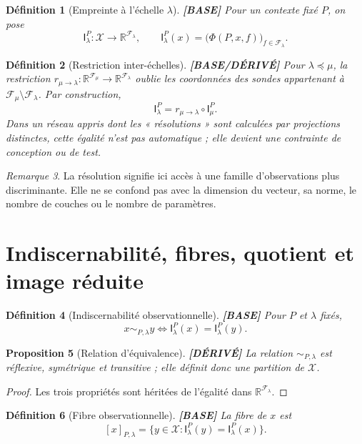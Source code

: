 \documentclass[11pt,a4paper]{article}
\newtheorem{definition}{Définition}[section]
\newtheorem{proposition}[definition]{Proposition}
\theoremstyle{remark}
\newtheorem{remark}[definition]{Remarque}
\newcommand{\R}{\mathbb R}
\newcommand{\X}{\mathcal X}
\newcommand{\F}{\mathcal F}
\newcommand{\Emp}{\mathsf I}
\begin{document}
\begin{definition}[Empreinte à l'échelle $\lambda$] \textbf{[BASE]}
Pour un contexte fixé $P$, on pose
\[
\Emp_{\lambda}^{P}:\X\to\R^{\F_\lambda},\qquad
\Emp_{\lambda}^{P}(x)=\big(\Phi(P,x,f)\big)_{f\in\F_\lambda}.
\]
\end{definition}

\begin{definition}[Restriction inter-échelles] \textbf{[BASE/DÉRIVÉ]}
Pour $\lambda\preceq\mu$, la restriction $r_{\mu\to\lambda}:\R^{\F_\mu}\to\R^{\F_\lambda}$ oublie les coordonnées des sondes appartenant à $\F_\mu\setminus\F_\lambda$. Par construction,
\[
\boxed{\Emp_\lambda^P=r_{\mu\to\lambda}\circ\Emp_\mu^P.}
\]
Dans un réseau appris dont les « résolutions » sont calculées par projections distinctes, cette égalité n'est pas automatique ; elle devient une contrainte de conception ou de test.
\end{definition}

\begin{remark}
La résolution signifie ici accès à une famille d'observations plus discriminante. Elle ne se confond pas avec la dimension du vecteur, sa norme, le nombre de couches ou le nombre de paramètres.
\end{remark}

\section{Indiscernabilité, fibres, quotient et image réduite}

\begin{definition}[Indiscernabilité observationnelle] \textbf{[BASE]}
Pour $P$ et $\lambda$ fixés,
\[
\boxed{x\sim_{P,\lambda}y\iff\Emp_\lambda^P(x)=\Emp_\lambda^P(y).}
\]
\end{definition}

\begin{proposition}[Relation d'équivalence] \textbf{[DÉRIVÉ]}
La relation $\sim_{P,\lambda}$ est réflexive, symétrique et transitive ; elle définit donc une partition de $\X$.
\end{proposition}
\begin{proof}
Les trois propriétés sont héritées de l'égalité dans $\R^{\F_\lambda}$.
\end{proof}

\begin{definition}[Fibre observationnelle] \textbf{[BASE]}
La fibre de $x$ est
\[
[x]_{P,\lambda}=\{y\in\X:\Emp_\lambda^P(y)=\Emp_\lambda^P(x)\}.
\]
\end{definition}
\end{document}
